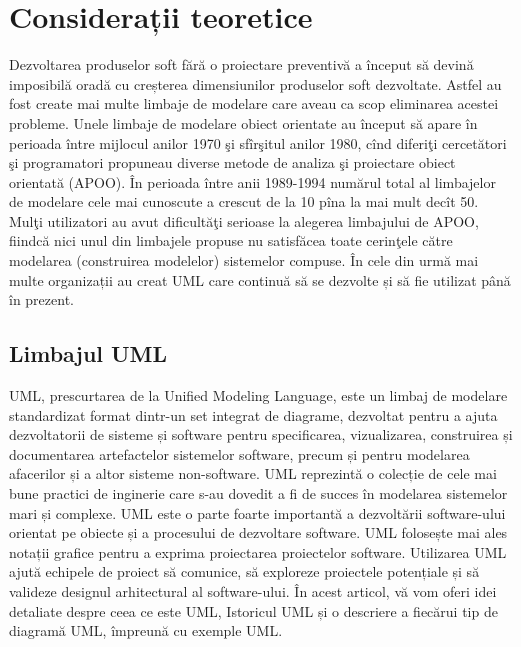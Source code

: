 \clearpage
\section{Considerații teoretice}

Dezvoltarea produselor soft fără o proiectare preventivă a început să devină
imposibilă oradă cu creșterea dimensiunilor produselor soft dezvoltate. Astfel
au fost create mai multe limbaje de modelare care aveau ca scop eliminarea
acestei probleme. Unele limbaje de modelare obiect orientate au început să
apare în perioada între mijlocul anilor 1970 şi sfîrşitul anilor 1980, cînd
diferiţi cercetători şi programatori propuneau diverse metode de analiza şi
proiectare obiect orientată (APOO). În perioada între anii 1989-1994 numărul
total al limbajelor de modelare cele mai cunoscute a crescut de la 10 pîna la
mai mult decît 50. Mulţi utilizatori  au avut dificultăţi  serioase la alegerea
limbajului  de APOO, fiindcă  nici unul din limbajele propuse nu satisfăcea
toate cerinţele către modelarea (construirea modelelor) sistemelor compuse. \cite{Melnic} În
cele din urmă mai multe organizații au creat UML care continuă să se dezvolte
și să fie utilizat până în prezent.

\subsection{Limbajul UML}
UML, prescurtarea de la Unified Modeling Language, este un limbaj de modelare
standardizat format dintr-un set integrat de diagrame, dezvoltat pentru a ajuta
dezvoltatorii de sisteme și software pentru specificarea, vizualizarea,
construirea și documentarea artefactelor sistemelor software, precum și pentru
modelarea afacerilor și a altor sisteme non-software. UML reprezintă o colecție
de cele mai bune practici de inginerie care s-au dovedit a fi de succes în
modelarea sistemelor mari și complexe. UML este o parte foarte importantă a
dezvoltării software-ului orientat pe obiecte și a procesului de dezvoltare
software. UML folosește mai ales notații grafice pentru a exprima proiectarea
proiectelor software. Utilizarea UML ajută echipele de proiect să comunice, să
exploreze proiectele potențiale și să valideze designul arhitectural al
software-ului. În acest articol, vă vom oferi idei detaliate despre ceea ce
este UML, Istoricul UML și o descriere a fiecărui tip de diagramă UML, împreună
cu exemple UML. \cite{UML}


